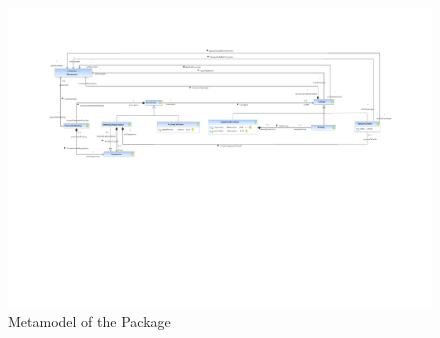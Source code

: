 %
%

\begin{figure}[htbp]
  \centering
  \includegraphics[width=\textheight,angle=90]{figures/A_technical-reference/packages/storydiagrams_calls/storydiagrams-calls}
  \caption{Metamodel of the  Package}
  \label{fig:MM:calls}
\end{figure}
